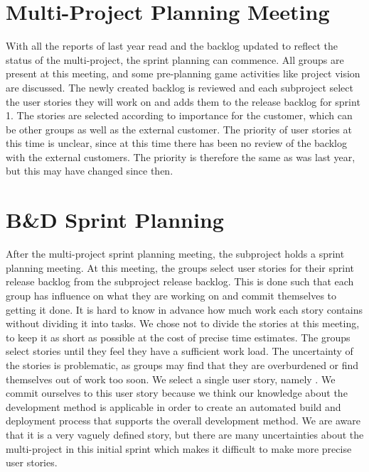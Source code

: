 \section{Multi-Project Planning Meeting}\label{sec:s1p_multiproject}
With all the reports of last year read and the backlog updated to reflect the status of the multi-project, the sprint planning can commence. All groups are present at this meeting, and some pre-planning game activities like project vision are discussed. The newly created backlog is reviewed and each subproject select the user stories they will work on and adds them to the release backlog for sprint 1. The stories are selected according to importance for the customer, which can be other groups as well as the external customer. The priority of user stories at this time is unclear, since at this time there has been no review of the backlog with the external customers. The priority is therefore the same as was last year, but this may have changed since then.

\section{B\&D Sprint Planning}\label{sec:s1p_bd}
After the multi-project sprint planning meeting, the \bd subproject holds a sprint planning meeting. At this meeting, the \bd groups select user stories for their sprint release backlog from the \bd subproject release backlog. This is done such that each group has influence on what they are working on and commit themselves to getting it done. It is hard to know in advance how much work each story contains without dividing it into tasks. We chose not to divide the stories at this meeting, to keep it as short as possible at the cost of precise time estimates. The groups select stories until they feel they have a sufficient work load. The uncertainty of the stories is problematic, as groups may find that they are overburdened or find themselves out of work too soon. We select a single user story, namely . We commit ourselves to this user story because we think our knowledge about the development method is applicable in order to create an automated build and deployment process that supports the overall development method. We are aware that it is a very vaguely defined story, but there are many uncertainties about the multi-project in this initial sprint which makes it difficult to make more precise user stories.

